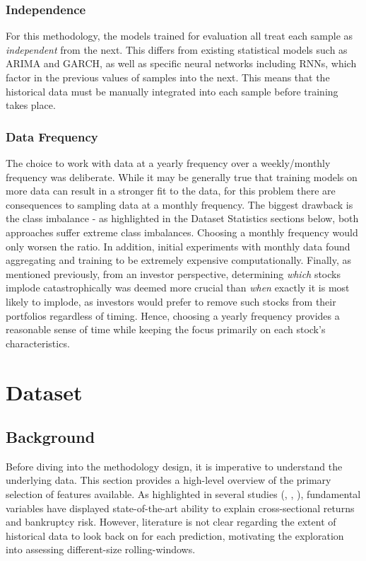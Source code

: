 \documentclass[a4paper]{report}
\begin{document}
\subsubsection{Independence}
For this methodology, the models trained for evaluation all treat each sample as \textit{independent} from the next. This differs from existing statistical models such 
as ARIMA and GARCH, as well as specific neural networks including RNNs, which factor in the previous values of samples into the next. This means that the historical data 
must be manually integrated into each sample before training takes place.

\subsubsection{Data Frequency}
The choice to work with data at a yearly frequency over a weekly/monthly frequency was deliberate. While it may be generally true that training models on more data 
can result in a stronger fit to the data, for this problem there are consequences to sampling data at a monthly frequency. The biggest drawback is the class imbalance - 
as highlighted in the Dataset Statistics sections below, both approaches suffer extreme class imbalances. Choosing a monthly 
frequency would only worsen the ratio. In addition, initial experiments with monthly data found aggregating and training to be extremely expensive computationally. Finally, as mentioned 
previously, from an investor perspective, determining \textit{which} stocks implode catastrophically was deemed more crucial than \textit{when} exactly 
it is most likely to implode, as investors would prefer to remove such stocks from their portfolios regardless of timing. Hence, choosing a yearly frequency provides a reasonable sense of time 
while keeping the focus primarily on each stock's characteristics. 

\section{Dataset}
\subsection{Background}
Before diving into the methodology design, it is imperative to understand the underlying data. This section provides a high-level overview of the primary selection of features available. As highlighted in several studies (\citep{fama1992cross}, \citep{fama1993common}, \citep{altman1968financial}), fundamental variables
have displayed state-of-the-art ability to explain cross-sectional returns and bankruptcy risk. However, literature is not clear regarding the extent of historical data to look back on for each prediction, motivating 
the exploration into assessing different-size rolling-windows.
\end{document}
